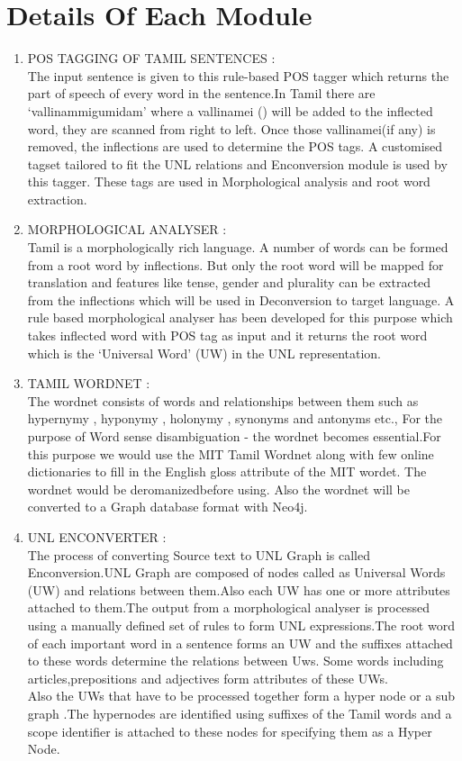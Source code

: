 \documentclass{article}
\begin{document}
\section{Details Of Each Module} \large
\begin{enumerate}
\item POS TAGGING OF TAMIL SENTENCES :
\\The input sentence is given to this rule-based POS tagger which returns the part of speech of every word in the sentence.In Tamil there are ‘vallinammigumidam’ where a vallinamei () will be added to the inflected word, they are scanned from right to left. Once those vallinamei(if any) is removed, the inflections are used to determine the POS tags. A customised tagset tailored to fit the UNL relations and Enconversion module is used by this tagger. These tags are used in Morphological analysis and root word extraction.

\item MORPHOLOGICAL ANALYSER :
\\Tamil is a morphologically rich language. A number of words can be formed from a root word by inflections. But only the root word will be mapped for translation and features like tense, gender and plurality can be extracted from the inflections which will be used in Deconversion to target language. A rule based morphological analyser has been developed for this purpose which takes inflected word with POS tag as input and it returns the root word which is the ‘Universal Word’ (UW) in the UNL representation.

\item TAMIL WORDNET :
\\The wordnet consists of words and relationships between them such as hypernymy , hyponymy , holonymy , synonyms and antonyms etc., For the purpose of Word sense disambiguation - the wordnet becomes essential.For this purpose we would use the MIT Tamil Wordnet along with few online dictionaries to fill in the English gloss attribute of the MIT wordet. The wordnet would be deromanizedbefore using. Also the wordnet will be converted to a Graph database format with Neo4j.

\item UNL ENCONVERTER :
\\The process of converting Source text to UNL Graph is called Enconversion.UNL Graph are composed of nodes called as Universal Words (UW) and relations between them.Also each UW has one or more attributes attached to them.The output from a morphological analyser is processed using a manually defined set of rules to form UNL expressions.The root word of each important word in a sentence forms an UW and the suffixes attached to these words determine the relations between Uws. Some words including articles,prepositions and adjectives form attributes of these UWs.
\\Also the UWs that have to be processed together form a hyper node or a sub graph .The hypernodes are identified using suffixes of the Tamil words and a scope identifier is attached to these nodes for specifying them as a Hyper Node.


\end{enumerate}
\end{document}
